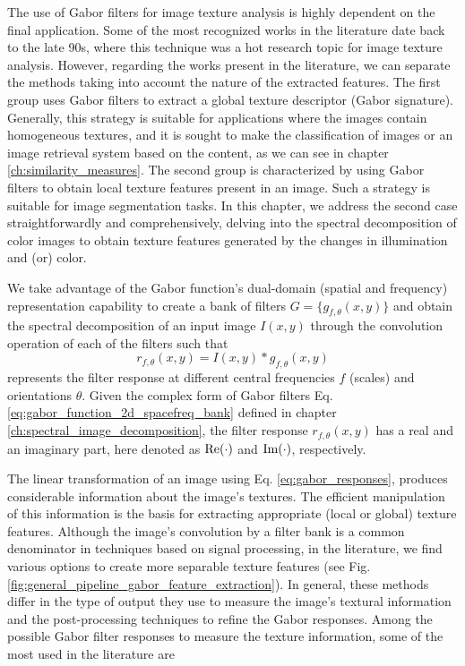 The use of Gabor filters for image texture analysis is highly dependent on the final application. Some of the most recognized works in the literature date back to the late 90s, where this technique was a hot research topic for image texture analysis. However, regarding the works present in the literature, we can separate the methods taking into account the nature of the extracted features. The first group uses Gabor filters to extract a global texture descriptor (Gabor signature). Generally, this strategy is suitable for applications where the images contain homogeneous textures, and it is sought to make the classification of images or an image retrieval system based on the content, as we can see in chapter \ref{ch:similarity_measures}. The second group is characterized by using Gabor filters to obtain local texture features present in an image. Such a strategy is suitable for image segmentation tasks. In this chapter, we address the second case straightforwardly and comprehensively, delving into the spectral decomposition of color images to obtain texture features generated by the changes in illumination and (or) color.

We take advantage of the Gabor function's dual-domain (spatial and frequency) representation capability to create a bank of filters $G=\{g_{f, \theta}(x, y) \}$ and obtain the spectral decomposition of an input image $I(x, y)$ through the convolution operation of each of the filters such that 
\begin{equation}\label{eq:gabor_responses}
    r_{f, \theta}(x,y) = I(x, y) \ast g_{f, \theta}(x,y)
\end{equation}
represents the filter response at different central frequencies $f$ (scales) and orientations $\theta$. Given the complex form of Gabor filters Eq. \eqref{eq:gabor_function_2d_spacefreq_bank} defined in chapter \ref{ch:spectral_image_decomposition}, the filter response $r_{f,\theta}(x, y)$ has a real and an imaginary part, here denoted as $\mathrm{Re}{(\cdot)}$ and $\mathrm{Im}{(\cdot)}$, respectively.

The linear transformation of an image using Eq. \eqref{eq:gabor_responses}, produces considerable information about the image's textures. The efficient manipulation of this information is the basis for extracting appropriate (local or global) texture features. Although the image's convolution by a filter bank is a common denominator in techniques based on signal processing, in the literature, we find various options to create more separable texture features (see Fig. \ref{fig:general_pipeline_gabor_feature_extraction}). In general, these methods differ in the type of output they use to measure the image's textural information and the post-processing techniques to refine the Gabor responses. Among the possible Gabor filter responses to measure the texture information, some of the most used in the literature are

